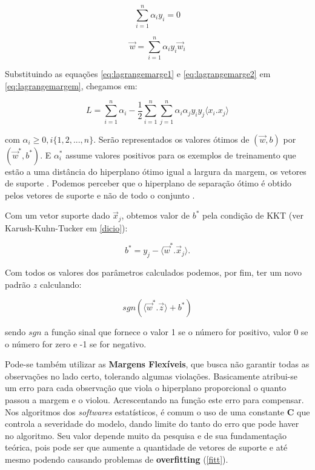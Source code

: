 \documentclass[
]{book}
\begin{document}
\begin{equation}
\displaystyle \sum^n_{i=1}\alpha_i y_i=0
\label{eq:lagrangemarge1}
\end{equation}

\begin{equation}
\vec{w}=\displaystyle \sum^n_{i=1}\alpha_i y_i \vec{w}_i
\label{eq:lagrangemarge2}
\end{equation}

Substituindo as equações \eqref{eq:lagrangemarge1} e \eqref{eq:lagrangemarge2} em \eqref{eq:lagrangemargem}, chegamos em:

\begin{equation}
L =\displaystyle \sum^n_{i=1}\alpha_i-\frac{1}{2} \displaystyle \sum^n_{i=1}\sum^n_{j=1}\alpha_i\alpha_j y_i y_j \langle x_i.x_j\rangle
\label{eq:lagrangemarge3}
\end{equation}

com \(\alpha_i\geq0,i\{1,2,...,n\}\). Serão representados os valores ótimos de \((\vec{w},b)\) por \((\vec{w}^*,b^*)\). E \(\alpha^*_i\) assume valores positivos para os exemplos de treinamento que estão a uma distância do hiperplano ótimo igual a largura da margem, os vetores de suporte \citep{gonccalves2015maquina}. Podemos perceber que o hiperplano de separação ótimo é obtido pelos vetores de suporte e não de todo o conjunto \citep{lorena2003introduccaoas}.

Com um vetor suporte dado \(\vec{x}_j\), obtemos valor de \(b^*\) pela condição de KKT (ver Karush-Kuhn-Tucker em \ref{dicio}):

\begin{equation}
b^* =y_j-\langle\vec{w}^*.\vec{x}_j \rangle.
\label{eq:kktsvm}
\end{equation}

Com todos os valores dos parâmetros calculados podemos, por fim, ter um novo padrão \(z\) calculando:

\begin{equation}
sgn(\langle \vec{w}^* . \vec{z}\rangle+b^*)
\label{eq:sgn}
\end{equation}

sendo \(sgn\) a função sinal que fornece o valor 1 se o número for positivo, valor 0 se o número for zero e -1 se for negativo.

Pode-se também utilizar as \textbf{Margens Flexíveis}, que busca não garantir todas as observações no lado certo, tolerando algumas violações. Basicamente atribui-se um erro para cada observação que viola o hiperplano proporcional o quanto passou a margem e o violou. Acrescentando na função este erro para compensar. Nos algoritmos dos \emph{softwares} estatísticos, é comum o uso de uma constante \textbf{C} que controla a severidade do modelo, dando limite do tanto do erro que pode haver no algoritmo. Seu valor depende muito da pesquisa e de sua fundamentação teórica, pois pode ser que aumente a quantidade de vetores de suporte e até mesmo podendo causando problemas de \textbf{overfitting} (\ref{fitt}).
\end{document}
